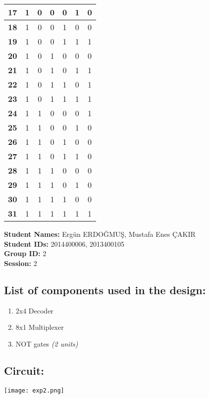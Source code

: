 \documentclass[12pt,a4paper]{report}
\begin{document}
\begin{center}
\begin{tabular}{|c|c|c|c|c|c|c|}
    \hline
    \textbf{17} & 1 & 0 & 0 & 0 & 1 & 0 \\
    \hline
    \textbf{18} & 1 & 0 & 0 & 1 & 0 & 0 \\
    \hline
    \textbf{19} & 1 & 0 & 0 & 1 & 1 & 1 \\
    \hline
    \textbf{20} & 1 & 0 & 1 & 0 & 0 & 0 \\
    \hline
    \textbf{21} & 1 & 0 & 1 & 0 & 1 & 1 \\
    \hline
    \textbf{22} & 1 & 0 & 1 & 1 & 0 & 1 \\
    \hline
    \textbf{23} & 1 & 0 & 1 & 1 & 1 & 1 \\
    \hline
    \textbf{24} & 1 & 1 & 0 & 0 & 0 & 1 \\
    \hline
    \textbf{25} & 1 & 1 & 0 & 0 & 1 & 0 \\
    \hline
    \textbf{26} & 1 & 1 & 0 & 1 & 0 & 0 \\
    \hline
    \textbf{27} & 1 & 1 & 0 & 1 & 1 & 0 \\
    \hline
    \textbf{28} & 1 & 1 & 1 & 0 & 0 & 0 \\
    \hline
    \textbf{29} & 1 & 1 & 1 & 0 & 1 & 0 \\
    \hline
    \textbf{30} & 1 & 1 & 1 & 1 & 0 & 0 \\
    \hline
    \textbf{31} & 1 & 1 & 1 & 1 & 1 & 1 \\
    \hline
  \end{tabular}
\end{center}

\newpage
\noindent
\textbf{Student Names:} Ergün ERDOĞMUŞ, Mustafa Enes ÇAKIR \\
\textbf{Student IDs:} 2014400006, 2013400105 \\
\textbf{Group ID:} 2 \\
\textbf{Session:} 2

\subsection*{List of components used in the design:}
\begin{enumerate}
  \item 2x4 Decoder
  \item 8x1 Multiplexer
  \item NOT gates \em{(2 units)}
\end{enumerate}


\subsection*{Circuit:}
\texttt{[image: exp2.png]}
\end{document}

